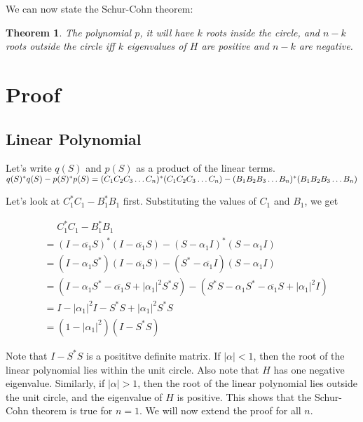 \documentclass[twofold]{article}
\newcommand*\conj[1]{\overline{#1}}
\newcommand*\adj[1]{#1^*}
\newcommand*\abs[1]{\left \vert #1 \right\vert}
\theoremstyle{plain}
\newtheorem*{theorem}{Theorem}
\theoremstyle{definition}
\begin{document}
We can now state the Schur-Cohn theorem:

\begin{theorem}The polynomial \(p\), it will have \(k\) roots inside the circle, and \(n-k\) roots outside the circle iff \(k\) eigenvalues of \(H\) are positive and \(n-k\) are negative. \end{theorem}

\section{Proof}


\subsection{Linear Polynomial}


Let's write \(q(S)\) and \(p(S)\) as a product of the linear terms. \(\adj{q(S)} q(S) - \adj{p(S)} p(S) \\= \adj{(C_1C_2C_3 \ldots C_n)}(C_1C_2C_3\ldots C_n) - \adj{(B_1B_2B_3\ldots B_n)} (B_1B_2B_3\ldots B_n)\)

Let's look at \(\adj{C_1} C_1 - \adj{B_1} B_1\) first. Substituting the values of \(C_1\) and \(B_1\), we get 

\begin{equation*}
\begin{split}
& \phantom{=}    \adj{C_1}C_1 - \adj{B_1} B_1 \\
 & = \adj{(I - \conj{\alpha_1}S)} (I - \conj{\alpha_1}S) - \adj{(S - \alpha_1 I)} (S - \alpha_1 I) \\
& = (I - \alpha_1\adj{S}) (I - \conj{\alpha_1}S) - (\adj{S} - \conj{\alpha_1} I) (S - \alpha_1 I) \\
 & = (I - \alpha_1\adj{S} - \conj{\alpha_1}S + \abs{\alpha_1}^2 \adj{S} S) - (\adj{S} S - \alpha_1 \adj{S} - \conj{\alpha_1} S + \abs{\alpha_1}^2I)\\
& = I - \abs{\alpha_1}^2 I - \adj{S} S + \abs{\alpha_1}^2 \adj{S} S \\
& = (1 - \abs{\alpha_1}^2) (I - \adj{S} S)
\end{split}
\end{equation*}

Note that \(I - \adj{S} S\) is a posititve definite matrix. If \(\abs{\alpha} < 1\), then the root of the linear polynomial lies within the unit circle. Also note that \(H\) has one negative eigenvalue. Similarly, if \(\abs{\alpha} > 1\), then the root of the linear polynomial lies outside the unit circle, and the eigenvalue of \(H\) is positive. This shows that the Schur-Cohn theorem is true for \(n = 1\). We will now extend the proof for all \(n\). 
\end{document}
